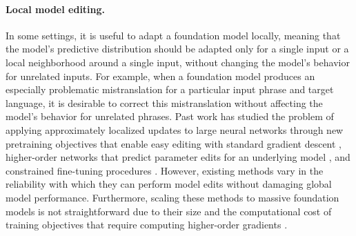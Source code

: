 \paragraph{Local model editing.} In some settings, it is useful to adapt a foundation model locally, meaning that the model's predictive distribution should be adapted only for a single input or a local neighborhood around a single input, without changing the model's behavior for unrelated inputs.
For example, when a foundation model produces an especially problematic mistranslation for a particular input phrase and target language, it is desirable to correct this mistranslation without affecting the model's behavior for unrelated phrases.
Past work has studied the problem of applying approximately localized updates to large neural networks through new pretraining objectives that enable easy editing with standard gradient descent \citep{sinitsin2020editable}, higher-order networks that predict parameter edits for an underlying model \citep{decao2021editing}, and constrained fine-tuning procedures \citep{zhu2020modifying}. However, existing methods vary in the reliability with which they can perform model edits without damaging global model performance. Furthermore, scaling these methods to massive foundation models is not straightforward due to their size and the computational cost of training objectives that require computing higher-order gradients \citep{sinitsin2020editable,decao2021editing}.

